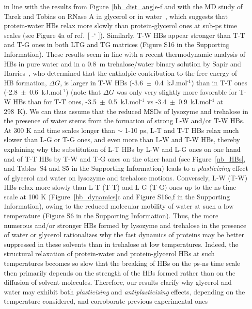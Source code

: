 \documentclass[journal=jpcbfk,manuscript=article]{achemso}
\newcommand*{\citen}[1]{%
\begingroup
\romannumeral-`\x %
\setcitestyle{numbers}%
\cite{#1}%
\endgroup   
}
\begin{document}
\begin{singlespacing}
in line with the results from Figure~\ref{hb_dist_ang}e-f and with the MD study of Tarek and Tobias on RNase A in glycerol or in 
water~\cite{Tarek2008}, which suggests that protein-water HBs relax more slowly than protein-glycerol ones at sub-ps time scales 
(see Figure 4a of ref.~[\citen{Tarek2008}]). Similarly, T-W HBs appear stronger than T-T and T-G ones in both LTG and TG matrices 
(Figure S16 in the Supporting Information). These results seem in line with a recent thermodynamic analysis of HBs in pure water 
and in a 0.8~m trehalose/water binary solution by Sapir and Harries~\cite{Sapir2017}, who determined that the enthalpic contribution 
to the free energy of HB formation, $\Delta G$, is larger in T-W HBs (-3.6~$\pm$~0.4~kJ.mol$^{\textrm{-1}}$) than in T-T ones 
(-2.8~$\pm$~0.6~kJ.mol$^{\textrm{-1}}$) (note that $\Delta G$ was only very slightly more favorable for T-W HBs than for T-T ones, 
-3.5~$\pm$~0.5~kJ.mol$^{\textrm{-1}}$ vs -3.4~$\pm$~0.9~kJ.mol$^{\textrm{-1}}$ at 298~K). 
We can thus assume that the reduced MSDs of lysozyme and trehalose in the presence 
of water stems from the formation of strong L-W and/or T-W HBs. At 300 K and time scales longer than $\sim$ 1-10 ps, L-T and T-T 
HBs relax much slower than L-G or T-G ones, and even more than L-W and T-W HBs, thereby explaining why the substitution of L-T HBs 
by L-W and L-G ones on one hand and of T-T HBs by T-W and T-G ones on the other hand (see Figure~\ref{nb_HBs}, and Tables~S4 and S5 in the 
Supporting Information) leads to a \textit{plasticizing} effect of glycerol and water on lysozyme and trehalose motions. Conversely, 
L-W (T-W) HBs relax more slowly than L-T (T-T) and L-G (T-G) ones up to the ns time scale at 100 K 
(Figure~\ref{hb_dynamics}c and Figure S16c,f in the Supporting Information), 
owing to the reduced molecular mobility of water at such a low temperature (Figure S6 in the Supporting Information). 
Thus, the more numerous and/or stronger HBs formed by lysozyme and trehalose in 
the presence of water or glycerol rationalizes why the fast dynamics of proteins may be better suppressed in these solvents than in 
trehalose at low temperatures. Indeed, the structural relaxation of protein-water and protein-glycerol HBs at such temperatures 
becomes so slow that the breaking of HBs on the ps-ns time scale then primarily depends on the strength of the HBs formed rather than 
on the diffusion of solvent molecules. Therefore, our results clarify why glycerol and water may exhibit both \textit{plasticizing} 
and \textit{antiplasticizing} effects, depending on the temperature considered, and corroborate previous experimental ones 

\end{singlespacing}
\end{document}

